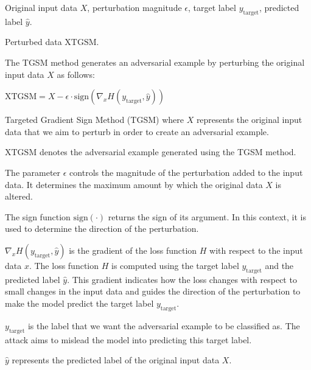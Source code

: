 Original input data $X$, perturbation magnitude $\epsilon$, target label $y_{\text{target}}$, predicted label $\hat{y}$.

Perturbed data $\text{XTGSM}$.

The TGSM method generates an adversarial example by perturbing the original input data $X$ as follows:

$\text{XTGSM} = X - \epsilon \cdot \text{sign} \left( \nabla_x H(y_{\text{target}}, \hat{y}) \right)$

 Targeted Gradient Sign Method (TGSM) where $X$ represents the original input data that we aim to perturb in order to create an adversarial example.

$\text{XTGSM}$ denotes the adversarial example generated using the TGSM method.

The parameter $\epsilon$ controls the magnitude of the perturbation added to the input data. It determines the maximum amount by which the original data $X$ is altered.

The sign function $\text{sign} \left( \cdot \right)$ returns the sign of its argument. In this context, it is used to determine the direction of the perturbation.

$\nabla_x H(y_{\text{target}}, \hat{y})$ is the gradient of the loss function $H$ with respect to the input data $x$. The loss function $H$ is computed using the target label $y_{\text{target}}$ and the predicted label $\hat{y}$. This gradient indicates how the loss changes with respect to small changes in the input data and guides the direction of the perturbation to make the model predict the target label $y_{\text{target}}$.

$y_{\text{target}}$ is the label that we want the adversarial example to be classified as. The attack aims to mislead the model into predicting this target label.

$\hat{y}$ represents the predicted label of the original input data $X$.
